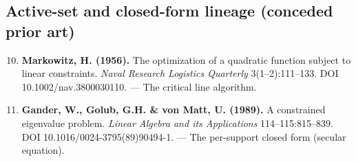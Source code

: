 \documentclass[11pt]{article}
\begin{document}
\subsection*{Active-set and closed-form lineage (conceded prior art)}
\begin{enumerate}\setcounter{enumi}{9}
\item \textbf{Markowitz, H. (1956).} The optimization of a quadratic function subject to linear constraints. \emph{Naval Research Logistics Quarterly} 3(1--2):111--133. DOI 10.1002/nav.3800030110. --- The critical line algorithm.
\item \textbf{Gander, W., Golub, G.H. \& von Matt, U. (1989).} A constrained eigenvalue problem. \emph{Linear Algebra and its Applications} 114--115:815--839. DOI 10.1016/0024-3795(89)90494-1. --- The per-support closed form (secular equation).
\end{enumerate}
\end{document}
